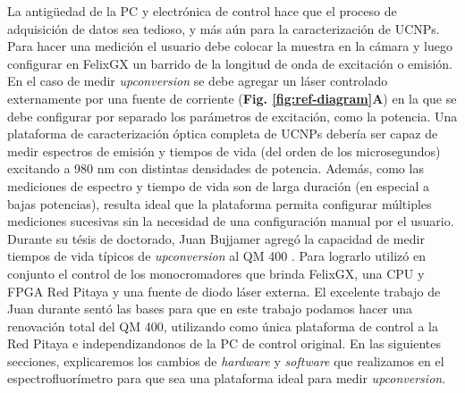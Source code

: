 La antigüedad de la PC y electrónica de control hace que el proceso de adquisición de datos sea tedioso, y más aún para la caracterización de UCNPs.
Para hacer una medición el usuario debe colocar la muestra en la cámara y luego configurar en FelixGX un barrido de la longitud de onda de excitación o emisión.
En el caso de medir \textit{upconversion} se debe agregar un láser controlado externamente por una fuente de corriente (\textbf{Fig. \ref{fig:ref-diagram}A}) en la que se debe configurar por separado los parámetros de excitación, como la potencia.
Una plataforma de caracterización óptica completa de UCNPs debería ser capaz de medir espectros de emisión y tiempos de vida (del orden de los microsegundos) excitando a 980 nm con distintas densidades de potencia.
Además, como las mediciones de espectro y tiempo de vida son de larga duración (en especial a bajas potencias), resulta ideal que la plataforma permita configurar múltiples mediciones sucesivas sin la necesidad de una configuración manual por el usuario.
Durante su tésis de doctorado, Juan Bujjamer agregó la capacidad de medir tiempos de vida típicos de \textit{upconversion} al QM 400 \cite{bujjamer2020}. 
Para lograrlo utilizó en conjunto el control de los monocromadores que brinda FelixGX, una CPU y FPGA Red Pitaya y una fuente de diodo láser externa.
El excelente trabajo de Juan durante sentó las bases para que en este trabajo podamos hacer una renovación total del QM 400, utilizando como única plataforma de control a la Red Pitaya e independizandonos de la PC de control original.
En las siguientes secciones, explicaremos los cambios de \textit{hardware} y \textit{software} que realizamos en el espectrofluorímetro para que sea una plataforma ideal para medir \textit{upconversion}.



